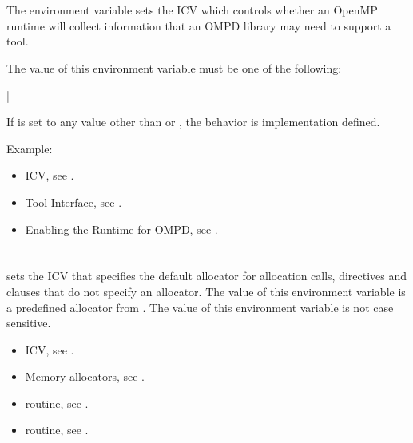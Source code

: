 \section{}
\label{sec:OMP_DEBUG}

The  environment variable sets the
 ICV which controls whether an OpenMP runtime
will collect information that an OMPD library may need to support
a tool.

The value of this environment variable must be one of the following:

{|}

If  is set to any value other than 
or , the behavior is implementation defined.

Example:
\begin{ompEnv}
\end{ompEnv}

\crossreferences
\begin{itemize}
\item {} ICV,
see .
\item Tool Interface, see .
\item Enabling the Runtime for OMPD, see .
\end{itemize}


\section{}
\label{sec:OMP_ALLOCATOR}

 sets the  ICV that specifies the default
allocator for allocation calls, directives and clauses that do not specify an allocator.
The value of this environment variable is a predefined allocator from . The value of this environment variable is not case sensitive.

\crossreferences
\begin{itemize}
\item {} ICV, see .

\item Memory allocators, see .

\item {} routine, see .

\item {} routine, see .
\end{itemize}


